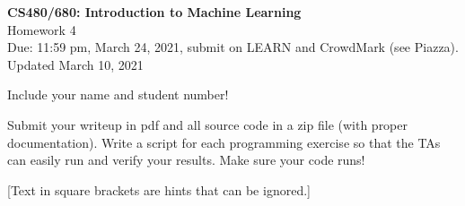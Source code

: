 \documentclass[10pt,letter,notitlepage]{article}
\newcommand{\red}[1]{{\color{red}#1}}
\newcounter{exercise}
\begin{document}
\begin{center}
\large{\textbf{CS480/680: Introduction to Machine Learning} \\ Homework 4\\ \red{Due: 11:59 pm, March 24, 2021}, \red{submit on LEARN and CrowdMark (see Piazza)}.} \\
\red{Updated March 10, 2021}

Include your name and student number!

\end{center}

\begin{center}
Submit your writeup in pdf and all source code in a zip file (with proper documentation). Write a script for each programming exercise so that the TAs can easily run and verify your results. Make sure your code runs!

[Text in square brackets are hints that can be ignored.]
\end{center}
\end{document}
